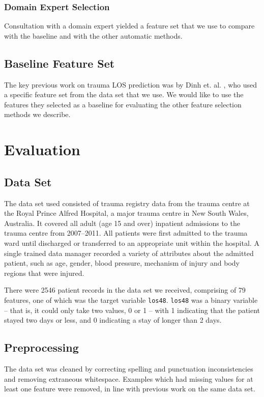 \documentclass{article}
\begin{document}
\subsubsection{Domain Expert Selection}
Consultation with a domain expert yielded a feature set that we
use to compare with the baseline and with the other automatic methods.

\subsection{Baseline Feature Set}
The key previous work on trauma LOS prediction was by Dinh et. al.
\cite{Dinh2013a}, who used a specific feature set from the data set that we
use. We would like to use the features they selected as a baseline for
evaluating the other feature selection methods we describe.

\section{Evaluation}
\label{sec:eval}
\subsection{Data Set}
The data set used consisted of trauma registry data from the trauma centre
at the Royal Prince Alfred Hospital, a major trauma centre in New South Wales,
Australia. It covered all adult (age 15 and over) inpatient admissions to the
trauma centre from 2007--2011. 
All patients were first admitted to the trauma ward until discharged
or transferred to an appropriate unit within the hospital. A single trained
data manager recorded a variety of attributes about the admitted patient,
such as age, gender, blood pressure, mechanism of injury and body regions
that were injured.

There were 2546 patient records in the data set we received, comprising of 79
features, one of which was the target variable \texttt{los48}.
\texttt{los48} was a binary variable -- that is, it could only take two
values, 0 or 1 -- with 1 indicating that the patient stayed two days or less,
and 0 indicating a stay of longer than 2 days.

\subsection{Preprocessing}
The data set was cleaned by correcting spelling and punctuation
inconsistencies and removing extraneous whitespace. Examples which had missing
values for at least one feature were removed, in line with previous work on the
same data set.
\end{document}
